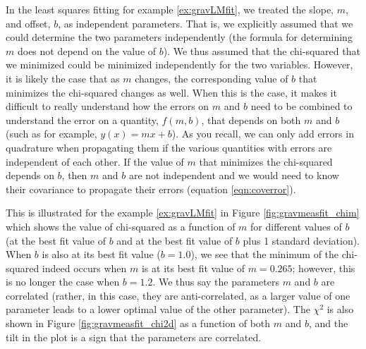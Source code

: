 In the least squares fitting for example \ref{ex:gravLMfit}, we treated the slope, $m$,  and offset, $b$, as independent parameters. That is, we explicitly assumed that we could determine the two parameters independently (the formula for determining $m$ does not depend on the value of $b$). We thus assumed that the chi-squared that we minimized could be minimized independently for the two variables. However, it is likely the case that as $m$ changes, the corresponding value of $b$ that minimizes the chi-squared changes as well. When this is the case, it makes it difficult to really understand how the errors on $m$ and $b$ need to be combined to understand the error on a quantity, $f(m,b)$, that depends on both $m$ and $b$ (such as for example, $y(x)=mx+b$). As you recall, we can only add errors in quadrature when propagating them if the various quantities with errors are independent of each other. If the value of $m$ that minimizes the chi-squared depends on $b$, then $m$ and $b$ are not independent and we would need to know their covariance to propagate their errors (equation \ref{eqn:coverror}).

This is illustrated for the example \ref{ex:gravLMfit} in Figure \ref{fig:gravmeasfit_chim} which shows the value of chi-squared as a function of $m$ for different values of $b$ (at the best fit value of $b$ and at the best fit value of $b$ plus 1 standard deviation). When $b$ is also at its best fit value ($b=1.0$), we see that the minimum of the chi-squared indeed occurs when $m$ is at its best fit value of $m=0.265$; however, this is no longer the case when $b=1.2$. We thus say the parameters $m$ and $b$ are correlated (rather, in this case, they are anti-correlated, as a larger value of one parameter leads to a lower optimal value of the other parameter). The $\chi^2$ is also shown in Figure \ref{fig:gravmeasfit_chi2d} as a function of both $m$ and $b$, and the tilt in the plot is a sign that the parameters are correlated.

